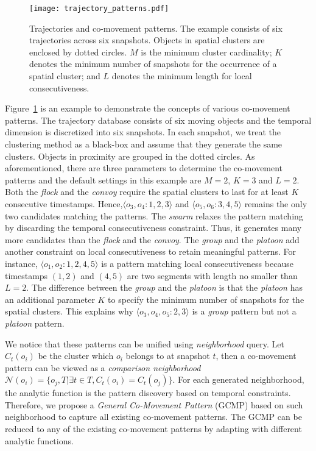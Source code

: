 \begin{figure}[h]
\centering
\texttt{[image: trajectory\_patterns.pdf]}
\caption{Trajectories and co-movement patterns. The example consists of six trajectories across six snapshots. Objects in spatial clusters are enclosed by dotted circles. $M$ is the minimum cluster cardinality; $K$ denotes the minimum number of snapshots for the occurrence of a spatial cluster; and $L$ denotes the minimum length for local consecutiveness.}
\label{fig:related_work}
\end{figure}

Figure~\ref{fig:related_work} is an example to demonstrate the concepts of various co-movement patterns. The trajectory database consists of six moving objects and the temporal dimension is discretized into six snapshots. In each snapshot, we treat the clustering method as a black-box and assume that they generate the same clusters. Objects in proximity are grouped in the dotted circles. As aforementioned, there are three parameters to determine the co-movement patterns and the default settings in this example are $M=2$, $K=3$ and $L=2$. Both the \emph{flock} and the \emph{convoy} require the spatial clusters to last for at least $K$ consecutive  timestamps. Hence,$\langle o_3,o_4:1,2,3 \rangle$ and $\langle o_5,o_6:3,4,5 \rangle$  remains the only two candidates matching the patterns. The \textit{swarm} relaxes the pattern matching by discarding the temporal consecutiveness constraint. Thus, it generates many more candidates than the \textit{flock} and the \textit{convoy}. The \textit{group} and the \textit{platoon} add another constraint on local consecutiveness to retain meaningful patterns. For instance, $\langle o_1,o_2:1,2,4,5 \rangle$ is a pattern matching local consecutiveness because timestamps $(1,2)$ and $(4,5)$ are two segments with length no smaller than $L=2$. The difference between the \textit{group} and the \textit{platoon} is that the \textit{platoon} has an additional parameter $K$ to specify the minimum number of snapshots for the spatial clusters. This explains why $\langle o_3,o_4,o_5:2,3 \rangle$ is a \textit{group} pattern but not a \textit{platoon} pattern.



We notice that these patterns can be unified using \emph{neighborhood} query. Let $C_t(o_i)$ be the cluster which $o_i$ belongs to at snapshot $t$, then a co-movement pattern 
can be viewed as a \emph{comparison neighborhood} $\mathcal{N}(o_i)=\{o_j, T | \exists t \in T, C_t(o_i) = C_t(o_j)\}$. For each generated neighborhood, the analytic function is the pattern discovery
based on temporal constraints. Therefore, we propose a \emph{General Co-Movement Pattern} (GCMP) based on such neighborhood to capture all existing co-movement patterns. The GCMP can be reduced to any of the existing co-movement patterns by adapting with different analytic functions.

